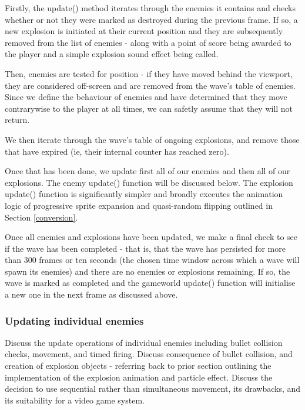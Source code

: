 \documentclass[11pt]{article}
\begin{document}
Firstly, the update() method iterates through the enemies it contains and
checks whether or not they were marked as destroyed during the previous frame.
If so, a new explosion is initiated at their current position and they are
subsequently removed from the list of enemies - along with a point of score being
awarded to the player and a simple explosion sound effect being called.

Then, enemies are tested for position - if they have moved behind the viewport,
they are considered off-screen and are removed from the wave's table of enemies.
Since we define the behaviour of enemies and have determined that they move
contrarywise to the player at all times, we can safetly assume that they will
not return.

We then iterate through the wave's table of ongoing explosions, and remove those
that have expired (ie, their internal counter has reached zero).

Once that has been done, we update first all of our enemies and then all of
our explosions. The enemy update() function will be discussed below. The
explosion update() function is significantly simpler and broadly executes
the animation logic of progressive sprite expansion and quasi-random flipping
outlined in Section \ref{conversion}.

Once all enemies and explosions have been updated, we make a final check to
see if the wave has been completed - that is, that the wave has persisted for
more than 300 frames or ten seconds (the chosen time window across which a
wave will spawn its enemies) and there are no enemies or explosions remaining.
If so, the wave is marked as completed and the game\textunderscore world update()
function will initialise a new one in the next frame as discussed above.

\subsubsection*{Updating individual enemies}

Discuss the update operations of individual enemies including bullet collision checks, movement, and
timed firing. Discuss consequence of bullet collision, and creation of explosion objects - referring back
to prior section outlining the implementation of the explosion animation and particle effect. Discuss
the decision to use sequential rather than simultaneous movement, its drawbacks, and its suitability for
a video game system.\cite[p. 16]{ericson}
\end{document}
